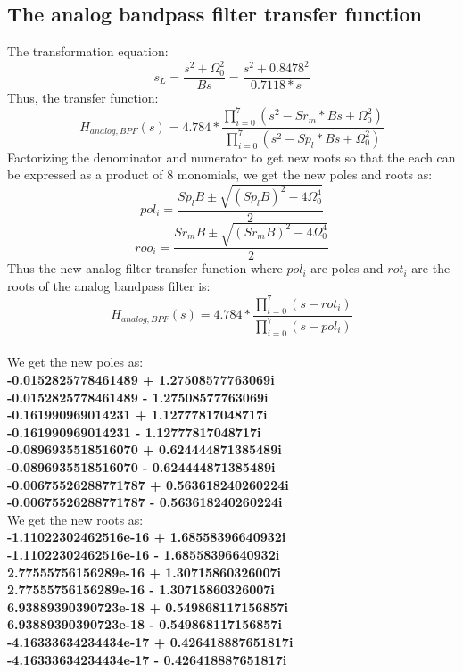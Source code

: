 \documentclass[12pt]{article}
\begin{document}
\subsection{The analog bandpass filter transfer function}
The transformation equation:
\begin{equation}
    s_L= \frac{s^2+\Omega_{0}^2}{Bs} = \frac{s^2+0.8478^2}{0.7118*s}
\end{equation}
Thus, the transfer function:
\begin{equation}
    H_{analog,BPF}(s)=4.784*\frac{\prod_{i=0}^{7}(s^2-Sr_m*Bs+\Omega_{0}^2)}{\prod_{i=0}^{7}(s^2-Sp_l*Bs+\Omega_{0}^2)} 
\end{equation}
Factorizing the denominator and numerator to get new roots so that the each can be expressed as a product of 8 monomials, we get the new poles and roots as:
\begin{equation}
    pol_i=\frac{Sp_lB\pm \sqrt{(Sp_lB)^2-4\Omega_{0}^4}}{2}
\end{equation}
\begin{equation}
    roo_i=\frac{Sr_mB\pm \sqrt{(Sr_mB)^2-4\Omega_{0}^4}}{2}
\end{equation}
Thus the new analog filter transfer function where $pol_i$ are poles and $rot_i$ are the roots of the analog bandpass filter is:
\begin{equation}
    H_{analog,BPF}(s)=4.784*\frac{\prod_{i=0}^{7}(s-rot_i)}{\prod_{i=0}^{7}(s-pol_i)} 
\end{equation}
\\We get the new poles as: \textbf{\\-0.0152825778461489 + 1.27508577763069i
\\-0.0152825778461489 - 1.27508577763069i
\\-0.161990969014231 + 1.12777817048717i
\\-0.161990969014231 - 1.12777817048717i
\\-0.0896935518516070 + 0.624444871385489i
\\-0.0896935518516070 - 0.624444871385489i
\\-0.00675526288771787 + 0.563618240260224i
\\-0.00675526288771787 - 0.563618240260224i}
\\We get the new roots as: \textbf{\\-1.11022302462516e-16 + 1.68558396640932i
\\-1.11022302462516e-16 - 1.68558396640932i
\\2.77555756156289e-16 + 1.30715860326007i
\\2.77555756156289e-16 - 1.30715860326007i
\\6.93889390390723e-18 + 0.549868117156857i
\\6.93889390390723e-18 - 0.549868117156857i
\\-4.16333634234434e-17 + 0.426418887651817i
\\-4.16333634234434e-17 - 0.426418887651817i}
    
\end{document}
